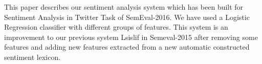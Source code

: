 This paper describes our sentiment analysis system which has been built for Sentiment Analysis in Twitter Task of SemEval-2016. We have used a Logistic Regression classifier with different groups of features. This system is an improvement to our previous system Lsislif  in Semeval-2015 after removing some features and adding  new features extracted from a new automatic constructed sentiment lexicon.
